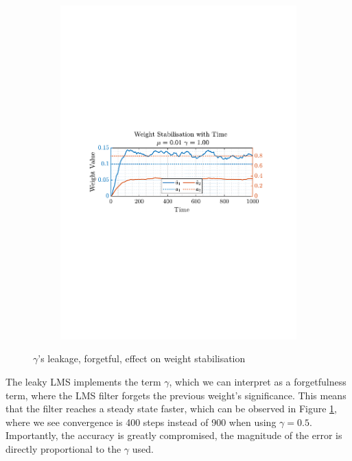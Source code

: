\documentclass[12pt]{article}
\numberwithin{equation}{section}
\begin{document}
\begin{figure}[H]
\begin{subfigure}{0.49\textwidth}
					\includegraphics[trim={2.2cm 11.2cm 3.00cm  11.2cm}, clip, width=\textwidth]{../MATLAB/figures/q2_1f_fig08.pdf} 
					\captionsetup{justification=centering}
				\end{subfigure}
				\captionsetup{justification=centering}
				\caption{$\gamma$'s leakage, forgetful, effect on weight stabilisation}
				\label{fig: 2-1f}
			\end{figure}
		
		The leaky LMS implements the term $\gamma$, which we can interpret as a forgetfulness term, where the LMS filter forgets the previous weight's significance. This means that the filter reaches a steady state faster, which can be observed in Figure \ref{fig: 2-1f}, where we see convergence is 400 steps instead of 900 when using $\gamma=0.5$. \\
		Importantly, the accuracy is greatly compromised, the magnitude of the error is directly proportional to the $\gamma$ used.
		 
\end{document}
